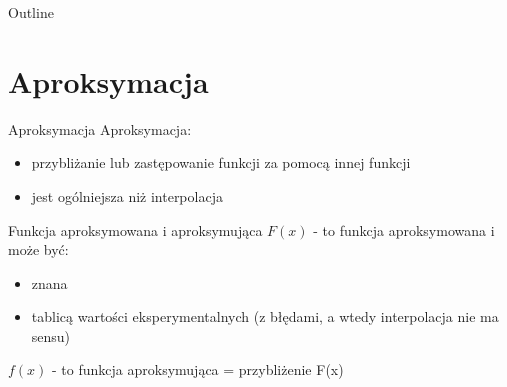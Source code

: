 

\subtitle{5. Aproksymacja}

  	\maketitle
  	\begin{frame}{Outline}
  			\tableofcontents
  	\end{frame}
	\section{Aproksymacja}
    \begin{frame}{Aproksymacja}
        Aproksymacja:
		\begin{itemize}
            \item przybliżanie lub zastępowanie funkcji za pomocą innej funkcji
            \item jest ogólniejsza niż interpolacja
        \end{itemize}
    \end{frame}
    \begin{frame}{Funkcja aproksymowana i aproksymująca}
        $F(x)$ - to funkcja aproksymowana i może być:
        \begin{itemize}
          \item znana
          \item tablicą wartości eksperymentalnych (z błędami, a wtedy interpolacja nie ma sensu)
        \end{itemize}
        \hfill \break
        $f(x)$ - to funkcja aproksymująca = przybliżenie F(x)
	\end{frame}
	
     
    
     
    


